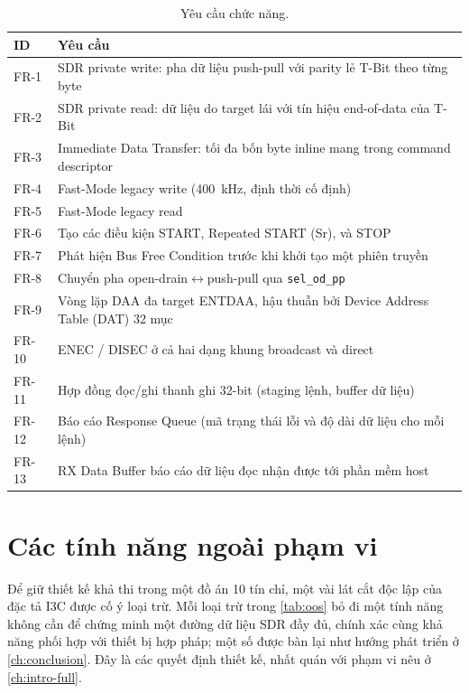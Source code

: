 \begin{table}[!htb]\centering
  \caption{Yêu cầu chức năng.}
  \label{tab:func-req}
  \small
  \begin{tabular}{@{}l >{\raggedright\arraybackslash}p{}@{}}
    \toprule
    \textbf{ID} & \textbf{Yêu cầu} \\
    \midrule
    FR-1  & SDR private write: pha dữ liệu push-pull với parity lẻ T-Bit theo từng byte \\
    FR-2  & SDR private read: dữ liệu do target lái với tín hiệu end-of-data của T-Bit \\
    FR-3  & Immediate Data Transfer: tối đa bốn byte inline mang trong command descriptor \\
    FR-4  & \iic{} Fast-Mode legacy write (\SI{400}{\kilo\hertz}, định thời cố định) \\
    FR-5  & \iic{} Fast-Mode legacy read \\
    FR-6  & Tạo các điều kiện START, Repeated START (Sr), và STOP \\
    FR-7  & Phát hiện Bus Free Condition trước khi khởi tạo một phiên truyền \\
    FR-8  & Chuyển pha open-drain$\leftrightarrow$push-pull qua \texttt{sel_od_pp} \\
    FR-9  & Vòng lặp DAA đa target ENTDAA, hậu thuẫn bởi Device Address Table (DAT) 32 mục \\
    FR-10 & ENEC / DISEC ở cả hai dạng khung broadcast và direct \\
    FR-11 & Hợp đồng đọc/ghi thanh ghi 32-bit (staging lệnh, buffer dữ liệu) \\
    FR-12 & Báo cáo Response Queue (mã trạng thái lỗi và độ dài dữ liệu cho mỗi lệnh) \\
    FR-13 & RX Data Buffer báo cáo dữ liệu đọc nhận được tới phần mềm host \\
    \bottomrule
  \end{tabular}
\end{table}

\section{Các tính năng ngoài phạm vi}
\label{sec:req-oos}

Để giữ thiết kế khả thi trong một đồ án 10 tín chỉ, một vài lát cắt độc lập của đặc tả I3C được
cố ý loại trừ. Mỗi loại trừ trong \cref{tab:oos} bỏ đi một tính năng không cần để chứng minh một
đường dữ liệu SDR đầy đủ, chính xác cùng khả năng phối hợp với thiết bị hợp pháp; một số được bàn
lại như hướng phát triển ở \cref{ch:conclusion}. Đây là các quyết định thiết kế, nhất quán với
phạm vi nêu ở \cref{ch:intro-full}.

